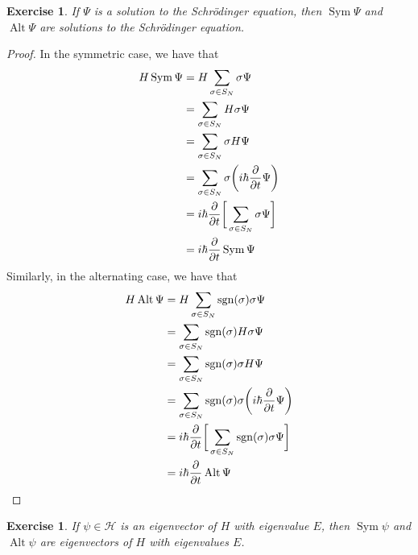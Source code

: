 \documentclass[12pt]{amsart}
\newtheorem{ex}[thm]{Exercise}
\newcommand{\sch}{Schr\"{o}dinger }
\newcommand{\sig}{\sigma}
\newcommand{\MH}{\mathcal{H}}
\DeclareMathOperator{\alt}{Alt}
\DeclareMathOperator{\sym}{Sym}
\DeclareMathOperator{\sgn}{sgn}
\begin{document}
\begin{ex}
	If $\Psi$ is a solution to the \sch equation, then $\sym \Psi$ and $\alt \Psi$ are solutions to the \sch equation.
\end{ex}

\begin{proof}
	In the symmetric case, we have that
	\begin{align*}
		H \sym \Psi 
		&= H \sum_{\sig \in S_N}\sig \Psi \\
		&= \sum_{\sig \in S_N} H \sig \Psi \\
		&= \sum_{\sig \in S_N} \sig H \Psi \\
		&= \sum_{\sig \in S_N}\sig \bigg( i\hbar \pdv{t} \Psi \bigg) \\
		&= i\hbar \pdv{t} \bigg[ \sum_{\sig \in S_N}\sig \Psi \bigg]  \\
		&= i\hbar \pdv{t} \sym \Psi
	\end{align*}
	Similarly, in the alternating case, we have that
	\begin{align*}
		H \alt \Psi 
		&= H \sum_{\sig \in S_N}\sgn(\sig) \sig \Psi \\
		&= \sum_{\sig \in S_N} \sgn(\sig) H \sig \Psi \\
		&= \sum_{\sig \in S_N} \sgn(\sig) \sig H \Psi \\
		&= \sum_{\sig \in S_N}\sgn(\sig) \sig  \bigg( i\hbar \pdv{t} \Psi \bigg) \\
		&= i\hbar \pdv{t}  \bigg[ \sum_{\sig \in S_N}\sgn(\sig) \sig \Psi \bigg] \\
		&= i\hbar \pdv{t} \alt \Psi
	\end{align*}
\end{proof}

\begin{ex}
	If $\psi \in \MH$ is an eigenvector of $H$ with eigenvalue $E$, then $\sym \psi$ and $\alt \psi$ are eigenvectors of $H$ with eigenvalues $E$.
\end{ex}
\end{document}
